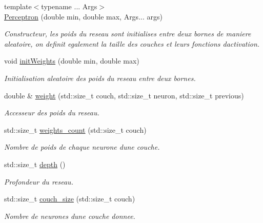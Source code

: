 \begin{DoxyCompactItemize}
\item 
{\footnotesize template$<$typename ... Args$>$ }\\\mbox{\hyperlink{classneuralnetwork_1_1_perceptron_a611ca300c9ad690d3d9496ed8f6634af}{Perceptron}} (double min, double max, Args... args)
\begin{DoxyCompactList}\small\item\em Constructeur, les poids du reseau sont initialises entre deux bornes de maniere aleatoire, on definit egalement la taille des couches et leurs fonctions d\textquotesingle{}activation. \end{DoxyCompactList}\item 
void \mbox{\hyperlink{classneuralnetwork_1_1_perceptron_a82ed55bb881ead0fd7bb8b37a870fd98}{init\+Weights}} (double min, double max)
\begin{DoxyCompactList}\small\item\em Initialisation aleatoire des poids du reseau entre deux bornes. \end{DoxyCompactList}\item 
double \& \mbox{\hyperlink{classneuralnetwork_1_1_perceptron_a6930cbdbb12382ffe13a5201d8ef47a8}{weight}} (std\+::size\+\_\+t couch, std\+::size\+\_\+t neuron, std\+::size\+\_\+t previous)
\begin{DoxyCompactList}\small\item\em Accesseur des poids du reseau. \end{DoxyCompactList}\item 
std\+::size\+\_\+t \mbox{\hyperlink{classneuralnetwork_1_1_perceptron_a9e4e8b2536a300feb5050478bd54e0ab}{weights\+\_\+count}} (std\+::size\+\_\+t couch)
\begin{DoxyCompactList}\small\item\em Nombre de poids de chaque neurone d\textquotesingle{}une couche. \end{DoxyCompactList}\item 
std\+::size\+\_\+t \mbox{\hyperlink{classneuralnetwork_1_1_perceptron_a967eda62d33f3ac45cff0e6be3e6630a}{depth}} ()
\begin{DoxyCompactList}\small\item\em Profondeur du reseau. \end{DoxyCompactList}\item 
std\+::size\+\_\+t \mbox{\hyperlink{classneuralnetwork_1_1_perceptron_a781b53edd909baab32eb6f6d9a3921d6}{couch\+\_\+size}} (std\+::size\+\_\+t couch)
\begin{DoxyCompactList}\small\item\em Nombre de neurones d\textquotesingle{}une couche donnee. \end{DoxyCompactList}\item 

\end{DoxyCompactItemize}
